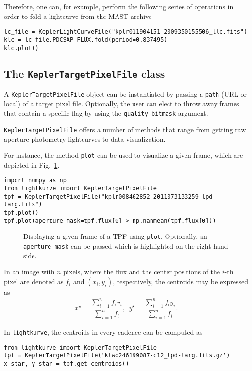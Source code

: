 \documentclass[twocolumn]{aastex62}
\begin{document}
Therefore, one can, for example, perform the following series of operations
in order to fold a lightcurve from the MAST archive
\begin{verbatim}
lc_file = KeplerLightCurveFile("kplr011904151-2009350155506_llc.fits")
klc = lc_file.PDCSAP_FLUX.fold(period=0.837495)
klc.plot()
\end{verbatim}

\subsection{The \texttt{KeplerTargetPixelFile} class}
A \texttt{KeplerTargetPixelFile} object can be instantiated
by passing a \texttt{path} (URL or local) of a target pixel file.
Optionally, the user can elect to throw away frames that contain
a specific flag by using the \texttt{quality\_bitmask} argument.

\texttt{KeplerTargetPixelFile} offers a number of methods
that range from getting raw aperture photometry lightcurves to
data visualization.

For instance, the method \texttt{plot} can be used to visualize a
given frame, which are depicted in Fig.~\ref{fig:plot-method}.

\begin{verbatim}
import numpy as np
from lightkurve import KeplerTargetPixelFile
tpf = KeplerTargetPixelFile("kplr008462852-2011073133259_lpd-targ.fits")
tpf.plot()
tpf.plot(aperture_mask=tpf.flux[0] > np.nanmean(tpf.flux[0]))
\end{verbatim}

\begin{figure}[!htb]
    \centering
    \caption{Displaying a given frame of a TPF using \texttt{plot}.
    Optionally, an \texttt{aperture\_mask} can be passed which is
    highlighted on the right hand side.}
    \label{fig:plot-method}
\end{figure}

In an image with $n$ pixels, where the flux and the center positions of the
$i$-th pixel are denoted as $f_i$ and $(x_i, y_i)$, respectively, the centroids
may be expressed as
\begin{align}
    x^{\star} = \dfrac{\sum_{i=1}^{n} f_i x_i}{\sum_{i=1}^{n}f_i},
    ~~y^{\star} = \dfrac{\sum_{i=1}^{n} f_i y_i}{\sum_{i=1}^{n}f_i}.
\end{align}

In \texttt{lightkurve}, the centroids in every cadence can be computed as
\begin{verbatim}
from lightkurve import KeplerTargetPixelFile
tpf = KeplerTargetPixelFile('ktwo246199087-c12_lpd-targ.fits.gz')
x_star, y_star = tpf.get_centroids()
\end{verbatim}
\end{document}
